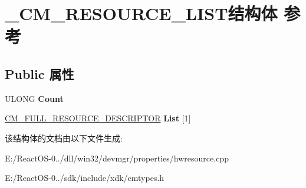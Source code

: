 \hypertarget{struct___c_m___r_e_s_o_u_r_c_e___l_i_s_t}{}\section{\+\_\+\+C\+M\+\_\+\+R\+E\+S\+O\+U\+R\+C\+E\+\_\+\+L\+I\+S\+T结构体 参考}
\label{struct___c_m___r_e_s_o_u_r_c_e___l_i_s_t}
\subsection*{Public 属性}
\begin{DoxyCompactItemize}
\item 
\mbox{\label{struct___c_m___r_e_s_o_u_r_c_e___l_i_s_t_abf46fdd44fa0ab63e7a9feb41691d390}} 
U\+L\+O\+NG {\bfseries Count}
\item 
\mbox{\label{struct___c_m___r_e_s_o_u_r_c_e___l_i_s_t_a771a12542c603769b9b26b98ebd407c7}} 
\hyperlink{struct___c_m___f_u_l_l___r_e_s_o_u_r_c_e___d_e_s_c_r_i_p_t_o_r}{C\+M\+\_\+\+F\+U\+L\+L\+\_\+\+R\+E\+S\+O\+U\+R\+C\+E\+\_\+\+D\+E\+S\+C\+R\+I\+P\+T\+OR} {\bfseries List} \mbox{[}1\mbox{]}
\end{DoxyCompactItemize}


该结构体的文档由以下文件生成\+:\begin{DoxyCompactItemize}
\item 
E\+:/\+React\+O\+S-\/0../dll/win32/devmgr/properties/hwresource.\+cpp\item 
E\+:/\+React\+O\+S-\/0../sdk/include/xdk/cmtypes.\+h\end{DoxyCompactItemize}
